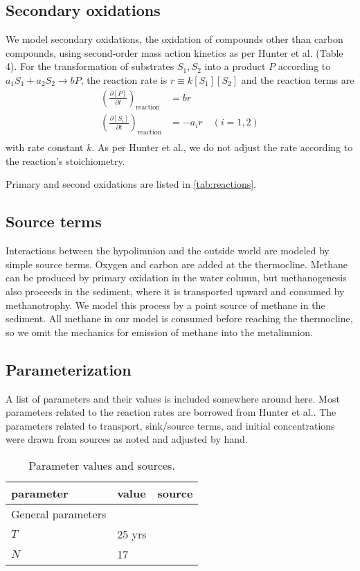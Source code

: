\documentclass{report}
\newcommand{\pd}[2]{ \frac{\partial #1}{\partial #2} }
\begin{document}
\subsection{Secondary oxidations}
We model secondary oxidations, the oxidation of compounds other than carbon compounds, using
second-order mass action kinetics as per Hunter et al.\cite{hunterkinetic1998} (Table 4). For the
transformation of substrates $S_1, S_2$ into a product $P$ according to $a_1 S_1 + a_2 S_2
\to b P$, the reaction rate is $r \equiv k [S_1] [S_2]$ and the reaction terms are
\begin{align}
  \left( \pd{[P]}{t} \right)_\text{reaction} &= b r \\
  \left( \pd{[S_i]}{t} \right)_\text{reaction} &= -a_i r \quad \left( i = 1, 2 \right) \\
\end{align}
with rate constant $k$. As per Hunter et al., we do not adjust the rate according to the reaction's stoichiometry.

Primary and second oxidations are listed in \ref{tab:reactions}.

\subsection{Source terms}
Interactions between the hypolimnion and the outside world are modeled by simple source terms. Oxygen and carbon are added at the thermocline. Methane can be produced by primary oxidation in the water column, but methanogenesis also proceeds in the sediment, where it is transported upward and consumed by methanotrophy. We model this process by a point source of methane in the sediment.
All methane in our model is consumed before reaching the thermocline, so we omit the mechanics for emission of methane into the metalimnion.

\subsection{Parameterization}
A list of parameters and their values is included somewhere around here. Most parameters
related to the reaction rates are borrowed from Hunter et al.\cite{hunterkinetic1998}. The
parameters related to transport, sink/source terms, and initial concentrations were drawn
from sources as noted and adjusted by hand. 

\begin{table}
\centering
\begin{tabular}{ l l l }
\toprule
parameter   &   value   & source \\
\midrule
General parameters \\
$T$     & 25 yrs  \\
$N$     & 17    \\
\bottomrule
\end{tabular}
\label{tab:parameters}
\caption{Parameter values and sources.}
\end{table}
\end{document}
